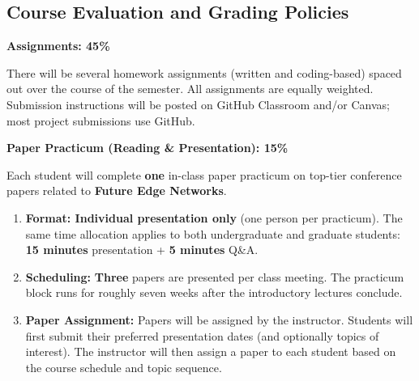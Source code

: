 
\subsection*{Course Evaluation and Grading Policies} 

\begin{outline} 
\1 \textbf{Assignments: 45\%}
\end{outline} 

There will be several homework assignments (written and coding-based) spaced out over the course of the semester. All assignments are equally weighted. Submission instructions will be posted on GitHub Classroom and/or Canvas; most project submissions use GitHub. \\




\begin{outline} 
\1 \textbf{Paper Practicum (Reading \& Presentation): 15\%}
\end{outline}

Each student will complete \textbf{one} in-class paper practicum on top-tier conference papers related to \textbf{Future Edge Networks}.

\begin{enumerate}[label=(\arabic*), leftmargin=2em]
  
  \item \textbf{Format: Individual presentation only} (one person per practicum). The same time allocation applies to both undergraduate and graduate students: \textbf{15 minutes} presentation + \textbf{5 minutes} Q\&A.

  \item \textbf{Scheduling:} \textbf{Three} papers are presented per class meeting. The practicum block runs for roughly seven weeks after the introductory lectures conclude.

  \item \textbf{Paper Assignment:} Papers will be assigned by the instructor. Students will first submit their preferred presentation dates (and optionally topics of interest). The instructor will then assign a paper to each student based on the course schedule and topic sequence.
\end{enumerate}


